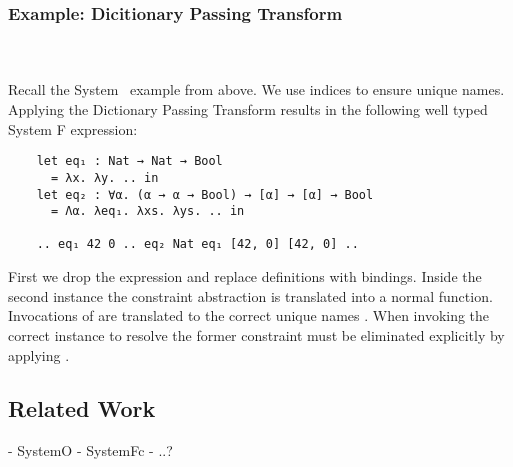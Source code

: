 \subsubsection{Example: Dicitionary Passing Transform}\hfill\\\\
Recall the System \Fo\ example from above. We use indices to ensure unique names.
Applying the Dictionary Passing Transform results in the following well typed System F expression:
\begin{verbatim}
    let eq₁ : Nat → Nat → Bool 
      = λx. λy. .. in
    let eq₂ : ∀α. (α → α → Bool) → [α] → [α] → Bool 
      = Λα. λeq₁. λxs. λys. .. in
    
    .. eq₁ 42 0 .. eq₂ Nat eq₁ [42, 0] [42, 0] .. 
\end{verbatim}
First we drop the \inl{|\Decl|}expression and replace \inl{|\Inst|}definitions with  bindings. Inside the second instance the constraint abstraction is translated into a normal function. Invocations of  are translated to the correct unique names . When invoking  the correct instance to resolve the former constraint must be eliminated explicitly by applying .
\subsection{Related Work}
- SystemO
- SystemFc
- ..?